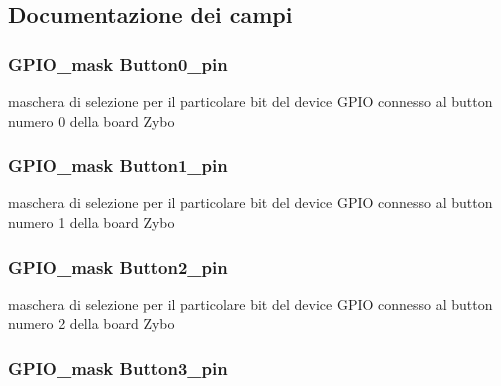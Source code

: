 \subsection{Documentazione dei campi}
\hypertarget{struct_zybo_button__t_aa079dc844a7d73e98b762cef39e9bf90}{
\subsubsection[{Button0\+\_\+pin}]{\setlength{\rightskip}{0pt plus 5cm}G\+P\+I\+O\+\_\+mask Button0\+\_\+pin}}\label{struct_zybo_button__t_aa079dc844a7d73e98b762cef39e9bf90}
maschera di selezione per il particolare bit del device G\+P\+I\+O connesso al button numero 0 della board Zybo \hypertarget{struct_zybo_button__t_aa4b6f01d89a502266798176affa8f59b}{
\subsubsection[{Button1\+\_\+pin}]{\setlength{\rightskip}{0pt plus 5cm}G\+P\+I\+O\+\_\+mask Button1\+\_\+pin}}\label{struct_zybo_button__t_aa4b6f01d89a502266798176affa8f59b}
maschera di selezione per il particolare bit del device G\+P\+I\+O connesso al button numero 1 della board Zybo \hypertarget{struct_zybo_button__t_a249726210aba837b00df4d2afc89965d}{
\subsubsection[{Button2\+\_\+pin}]{\setlength{\rightskip}{0pt plus 5cm}G\+P\+I\+O\+\_\+mask Button2\+\_\+pin}}\label{struct_zybo_button__t_a249726210aba837b00df4d2afc89965d}
maschera di selezione per il particolare bit del device G\+P\+I\+O connesso al button numero 2 della board Zybo \hypertarget{struct_zybo_button__t_a0be2104e3b0077272dcbfee7dbdb14ee}{
\subsubsection[{Button3\+\_\+pin}]{\setlength{\rightskip}{0pt plus 5cm}G\+P\+I\+O\+\_\+mask Button3\+\_\+pin}}\label{struct_zybo_button__t_a0be2104e3b0077272dcbfee7dbdb14ee}
